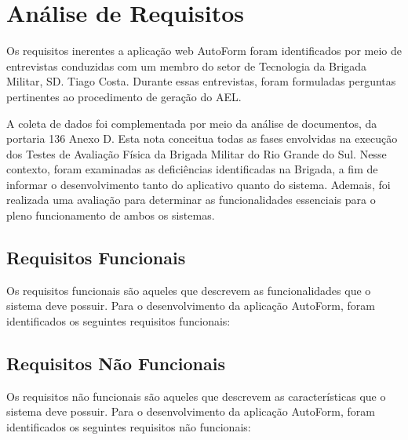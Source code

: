 \section{Análise de Requisitos}
Os requisitos inerentes a aplicação web AutoForm foram identificados por meio de entrevistas conduzidas com um membro do setor de Tecnologia da Brigada Militar, SD. Tiago Costa. Durante essas entrevistas, foram formuladas perguntas pertinentes ao procedimento de geração do AEL.

A coleta de dados foi complementada por meio da análise de documentos, da portaria 136 Anexo D. Esta nota conceitua todas as fases envolvidas na execução dos Testes de Avaliação Física da Brigada Militar do Rio Grande do Sul. Nesse contexto, foram examinadas as deficiências identificadas na Brigada, a fim de informar o desenvolvimento tanto do aplicativo quanto do sistema. Ademais, foi realizada uma avaliação para determinar as funcionalidades essenciais para o pleno funcionamento de ambos os sistemas.

\subsection{Requisitos Funcionais}
Os requisitos funcionais são aqueles que descrevem as funcionalidades que o sistema deve possuir. Para o desenvolvimento da aplicação AutoForm, foram identificados os seguintes requisitos funcionais:

\subsection{Requisitos Não Funcionais}
Os requisitos não funcionais são aqueles que descrevem as características que o sistema deve possuir. Para o desenvolvimento da aplicação AutoForm, foram identificados os seguintes requisitos não funcionais:



